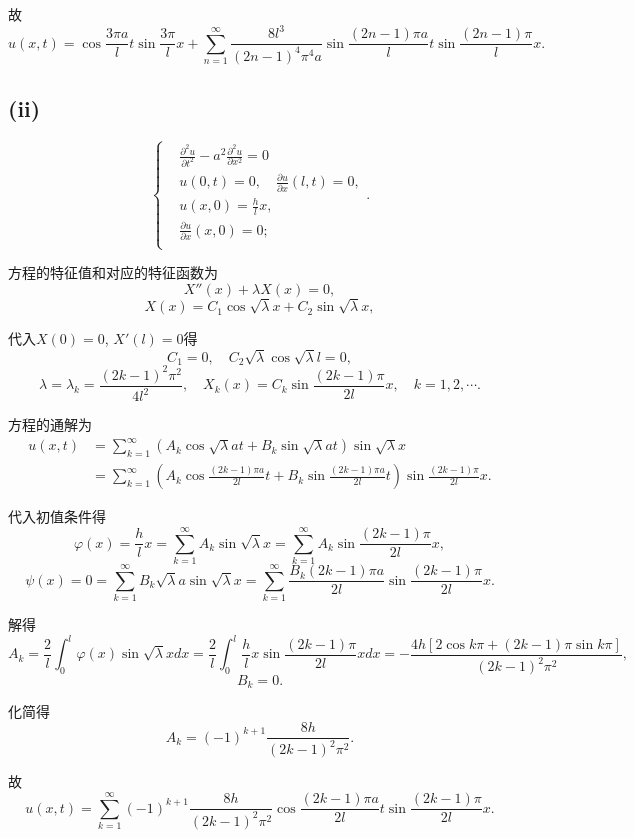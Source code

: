 \documentclass[11pt,a4paper]{article}
\begin{document}
故
$$u(x,t)=\cos\frac{3\pi a}{l}t\sin\frac{3\pi}{l}x+\sum_{n=1}^\infty\frac{8l^3}{(2n-1)^4\pi^4a}\sin\frac{(2n-1)\pi a}{l}t\sin\frac{(2n-1)\pi}{l}x.$$

\subsection*{(ii)}

$$
  \left\{\begin{aligned}
     & \frac{\partial^2u}{\partial t^2}-a^2\frac{\partial^2u}{\partial x^2}=0 \\
     & u(0,t)=0,\quad \frac{\partial u}{\partial x}(l,t)=0,                   \\
     & u(x,0)=\frac{h}{l}x,                                                   \\
     & \frac{\partial u}{\partial x}(x,0)=0;                                  \\
  \end{aligned}\right..
$$

方程的特征值和对应的特征函数为
$$X''(x)+\lambda X(x)=0,$$
$$X(x)=C_1\cos\sqrt{\lambda}x+C_2\sin\sqrt{\lambda}x,$$

代入$X(0)=0$, $X'(l)=0$得
$$C_1=0,\quad C_2\sqrt{\lambda}\cos\sqrt{\lambda}l=0,$$
$$\lambda=\lambda_k=\frac{(2k-1)^2\pi^2}{4l^2},\quad X_k(x)=C_k\sin\frac{(2k-1)\pi}{2l}x,\quad k=1,2,\cdots.$$

方程的通解为
\begin{align*}
  u(x,t)
   & =\sum_{k=1}^\infty\left(A_k\cos\sqrt{\lambda}at+
  B_k\sin\sqrt{\lambda}at\right)\sin\sqrt{\lambda}x          \\
   & =\sum_{k=1}^\infty\left(A_k\cos\frac{(2k-1)\pi a}{2l}t+
  B_k\sin\frac{(2k-1)\pi a}{2l}t\right)\sin\frac{(2k-1)\pi}{2l}x.
\end{align*}

代入初值条件得
$$\varphi(x)=\frac{h}{l}x=\sum_{k=1}^\infty A_k\sin\sqrt{\lambda}x=\sum_{k=1}^\infty A_k\sin\frac{(2k-1)\pi }{2l}x,$$
$$\psi(x)=0=\sum_{k=1}^\infty B_k\sqrt{\lambda}a\sin\sqrt{\lambda}x=\sum_{k=1}^\infty \frac{B_k(2k-1)\pi a}{2l}\sin\frac{(2k-1)\pi}{2l}x.$$

解得
$$A_k=\frac{2}{l}\int_0^l\varphi(x)\sin\sqrt{\lambda}xdx=\frac{2}{l}\int_0^l\frac{h}{l}x\sin\frac{(2k-1)\pi}{2l}xdx=-\frac{4h[2\cos k\pi+(2k-1)\pi\sin k\pi]}{(2k-1)^2\pi^2},$$
$$B_k=0.$$

化简得
$$A_k=(-1)^{k+1}\frac{8h}{(2k-1)^2\pi^2}.$$

故
$$u(x,t)=\sum_{k=1}^\infty (-1)^{k+1}\frac{8h}{(2k-1)^2\pi^2}\cos\frac{(2k-1)\pi a}{2l}t\sin\frac{(2k-1)\pi}{2l}x.$$
\end{document}

